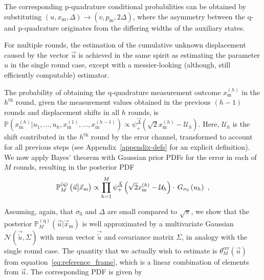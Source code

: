 \documentclass[prx,reprint,superscriptaddress,longbibliography,floatfix,nofootinbib]{revtex4-1}
\begin{document}
The corresponding p-quadrature conditional probabilities can be obtained by substituting 
$(u,x_{\text{m}},\Delta) \rightarrow (v,p_\text{m}, 2\Delta)$, where the asymmetry between the q- and p-quadrature originates from the differing widths of the auxiliary states.

For multiple rounds, the estimation of the cumulative unknown displacement caused by the vector $\vec{u}$ is achieved in the same spirit as estimating the parameter $u$ in the single round case, except with a messier-looking (although, still efficiently computable) estimator.

The probability of obtaining the q-quadrature measurement outcome $x_{\text{m}}^{(h)}$ in the $h^{\text{th}}$ round, given the measurement values obtained in the previous $(h-1)$ rounds and displacement shifts in all $h$ rounds, is  $\mathbb{P}(x^{(h)}_{\text{m}}|u_1,...,u_h,x^{(1)}_{\text{m}},...,x^{(h-1)}_{\text{m}}) \propto \psi^{\vec{\Delta}}_{+}(\sqrt{2}x^{(h)}_{\text{m}}-\mathcal{U}_h)$.
Here, $\mathcal{U}_h$ is the shift contributed in the $h^\text{th}$ round by the error channel, transformed to account for all previous steps (see Appendix\ \ref{appendix-defs} for an explicit definition).
We now apply Bayes' theorem with Gaussian prior PDFs for the error in each of $M$ rounds, resulting in the posterior PDF
%
\begin{equation}
    \mathbb{P}^{(\text{q})}_{M}\left(\vec{u} \big| \vec{x}_\text{m} \right) \propto \prod_{h=1}^{M}\psi^{\vec{\Delta}}_{+}\left(\sqrt{2}x^{(h)}_{\text{m}}-\mathcal{U}_h\right) \cdot \hspace{0.05cm} G_{\sigma_0}\left(u_h\right) \ , 
    \label{eq:PUXM}
\end{equation}

Assuming, again, that $\sigma_0$ and $\Delta$ are small compared to $\sqrt{\pi}$, we show that the posterior $\mathbb{P}^{(\text{q})}_{M}(\vec{u}|\vec{x}_\text{m})$ is well approximated by a multivariate Gaussian $\mathcal{N}(\vec{\tilde{u}},\Sigma)$ with mean vector $\vec{\tilde{u}}$ and covariance matrix $\Sigma$, in analogy with the single round case.
The quantity that we actually wish to estimate is $\theta_M^{\mathrm{err}}(\vec{u})$ from equation\ \eqref{eq:reference_frame}, which is a linear combination of elements from $\vec{u}$. The corresponding PDF is given by
\end{document}
